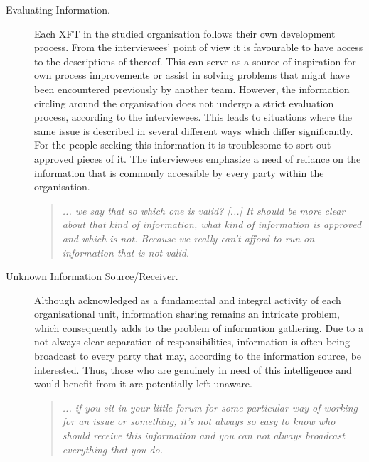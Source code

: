 \begin{description}

   \item[Evaluating Information.] Each XFT in the studied organisation follows their own development process. From the interviewees' point of view it is favourable to have access to the descriptions of thereof. This can serve as a source of inspiration for own process improvements or assist in solving problems that might have been encountered previously by another team. However, the information circling around the organisation does not undergo a strict evaluation process, according to the interviewees. This leads to situations where the same issue is described in several different ways which differ significantly. For the people seeking this information it is troublesome to sort out approved pieces of it. The interviewees emphasize a need of reliance on the information that is commonly accessible by every party within the organisation.
   
      \begin{quote}\itshape ... we say that  so which one is valid? [...] It should be more clear about that kind of information, what kind of information is approved and which is not. Because we really can't afford to run on information that is not valid.
      \end{quote}

   \item[Unknown Information Source/Receiver.] Although acknowledged as a fundamental and integral activity of each organisational unit, information sharing remains an intricate problem, which consequently adds to the problem of information gathering. Due to a not always clear separation of responsibilities, information is often being broadcast to every party that may, according to the information source, be interested. Thus, those who are genuinely in need of this intelligence and would benefit from it are potentially left unaware.
   
      \begin{quote}\itshape ... if you sit in your little forum for some particular way of working for an issue or something, it’s not always so easy to know who should receive this information and you can not always broadcast everything that you do.%
      \end{quote}
      

\end{description}
